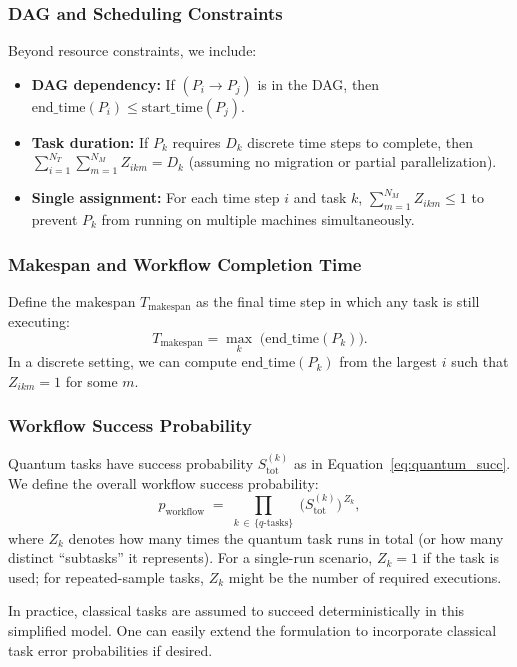 \documentclass{article}
\begin{document}
\subsubsection{DAG and Scheduling Constraints}
Beyond resource constraints, we include:
\begin{itemize}
  \item \textbf{DAG dependency:} If $(P_i \to P_j)$ is in the DAG, then $\mathrm{end\_time}(P_i) \le \mathrm{start\_time}(P_j)$.
  \item \textbf{Task duration:} If $P_k$ requires $D_k$ discrete time steps to complete, then $\sum_{i=1}^{N_T}\sum_{m=1}^{N_M} Z_{ikm} = D_k$ (assuming no migration or partial parallelization).
  \item \textbf{Single assignment:} For each time step $i$ and task $k$, $\sum_{m=1}^{N_M} Z_{ikm} \le 1$ to prevent $P_k$ from running on multiple machines simultaneously.
\end{itemize}

\subsubsection{Makespan and Workflow Completion Time}
Define the makespan $T_{\mathrm{makespan}}$ as the final time step in which any task is still executing:
\[
T_{\mathrm{makespan}} = \max_{k}\; \bigl(\mathrm{end\_time}(P_k)\bigr).
\]
In a discrete setting, we can compute $\mathrm{end\_time}(P_k)$ from the largest $i$ such that $Z_{ikm}=1$ for some $m$.

\subsubsection{Workflow Success Probability}
Quantum tasks have success probability $S_{\mathrm{tot}}^{(k)}$ as in Equation~\eqref{eq:quantum_succ}. We define the overall workflow success probability:
\begin{equation}
p_{\mathrm{workflow}} \;=\; 
\prod_{k \,\in\, \{q\text{-tasks}\}}\;
\bigl(S_{\mathrm{tot}}^{(k)}\bigr)^{\,Z_k},
\end{equation}
where $Z_k$ denotes how many times the quantum task runs in total (or how many distinct “subtasks” it represents). For a single-run scenario, $Z_k = 1$ if the task is used; for repeated-sample tasks, $Z_k$ might be the number of required executions.

In practice, classical tasks are assumed to succeed deterministically in this simplified model. One can easily extend the formulation to incorporate classical task error probabilities if desired.
\end{document}
